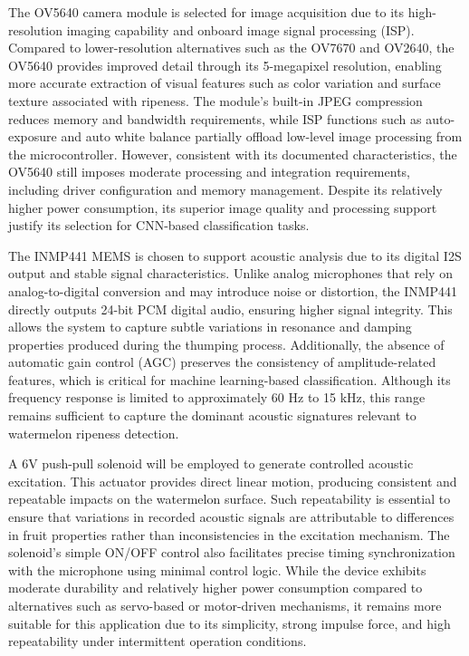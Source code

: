\begin{thesisprose}
The OV5640 camera module is selected for image acquisition due to its high-resolution imaging capability and onboard image signal processing (ISP). Compared to lower-resolution alternatives such as the OV7670 and OV2640, the OV5640 provides improved detail through its 5-megapixel resolution, enabling more accurate extraction of visual features such as color variation and surface texture associated with ripeness. The module’s built-in JPEG compression reduces memory and bandwidth requirements, while ISP functions such as auto-exposure and auto white balance partially offload low-level image processing from the microcontroller. However, consistent with its documented characteristics, the OV5640 still imposes moderate processing and integration requirements, including driver configuration and memory management. Despite its relatively higher power consumption, its superior image quality and processing support justify its selection for CNN-based classification tasks.

The INMP441 MEMS  is chosen to support acoustic analysis due to its digital I2S output and stable signal characteristics. Unlike analog microphones that rely on analog-to-digital conversion and may introduce noise or distortion, the INMP441 directly outputs 24-bit PCM digital audio, ensuring higher signal integrity. This allows the system to capture subtle variations in resonance and damping properties produced during the thumping process. Additionally, the absence of automatic gain control (AGC) preserves the consistency of amplitude-related features, which is critical for machine learning-based classification. Although its frequency response is limited to approximately 60 Hz to 15 kHz, this range remains sufficient to capture the dominant acoustic signatures relevant to watermelon ripeness detection.

A 6V push-pull solenoid will be employed to generate controlled acoustic excitation. This actuator provides direct linear motion, producing consistent and repeatable impacts on the watermelon surface. Such repeatability is essential to ensure that variations in recorded acoustic signals are attributable to differences in fruit properties rather than inconsistencies in the excitation mechanism. The solenoid’s simple ON/OFF control also facilitates precise timing synchronization with the microphone using minimal control logic. While the device exhibits moderate durability and relatively higher power consumption compared to alternatives such as servo-based or motor-driven mechanisms, it remains more suitable for this application due to its simplicity, strong impulse force, and high repeatability under intermittent operation conditions.


\end{thesisprose}
